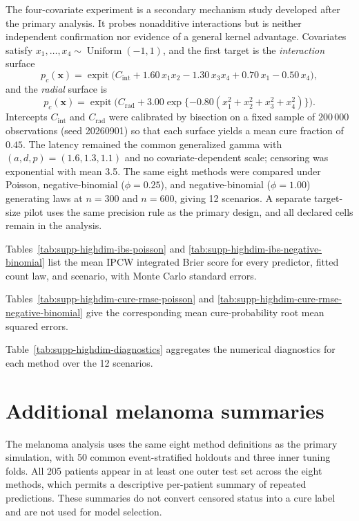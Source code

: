 \documentclass[11pt]{article}
\begin{document}
The four-covariate experiment is a secondary mechanism study developed after the primary analysis. It probes nonadditive interactions but is neither independent confirmation nor evidence of a general kernel advantage. Covariates satisfy $x_1,\dots,x_4\sim\operatorname{Uniform}(-1,1)$, and the first target is the \emph{interaction} surface
\begin{equation}
p_c(\bm{x})=\operatorname{expit}\bigl(C_{\mathrm{int}}+1.60\,x_1x_2-1.30\,x_3x_4+0.70\,x_1-0.50\,x_4\bigr),
\end{equation}
and the \emph{radial} surface is
\begin{equation}
p_c(\bm{x})=\operatorname{expit}\bigl(C_{\mathrm{rad}}+3.00\exp\{-0.80(x_1^2+x_2^2+x_3^2+x_4^2)\}\bigr).
\end{equation}
Intercepts $C_{\mathrm{int}}$ and $C_{\mathrm{rad}}$ were calibrated by bisection on a fixed sample of $200\,000$ observations (seed 20260901) so that each surface yields a mean cure fraction of $0.45$. The latency remained the common generalized gamma with $(a,d,p)=(1.6,1.3,1.1)$ and no covariate-dependent scale; censoring was exponential with mean 3.5. The same eight methods were compared under Poisson, negative-binomial ($\phi=0.25$), and negative-binomial ($\phi=1.00$) generating laws at $n=300$ and $n=600$, giving 12 scenarios. A separate target-size pilot uses the same precision rule as the primary design, and all declared cells remain in the analysis.

Tables~\ref{tab:supp-highdim-ibs-poisson} and \ref{tab:supp-highdim-ibs-negative-binomial} list the mean IPCW integrated Brier score for every predictor, fitted count law, and scenario, with Monte Carlo standard errors.


Tables~\ref{tab:supp-highdim-cure-rmse-poisson} and \ref{tab:supp-highdim-cure-rmse-negative-binomial} give the corresponding mean cure-probability root mean squared errors.


Table~\ref{tab:supp-highdim-diagnostics} aggregates the numerical diagnostics for each method over the 12 scenarios.

\section{Additional melanoma summaries}\label{sec:supp-melanoma}

The melanoma analysis uses the same eight method definitions as the primary simulation, with 50 common event-stratified holdouts and three inner tuning folds. All 205 patients appear in at least one outer test set across the eight methods, which permits a descriptive per-patient summary of repeated predictions. These summaries do not convert censored status into a cure label and are not used for model selection.
\end{document}
